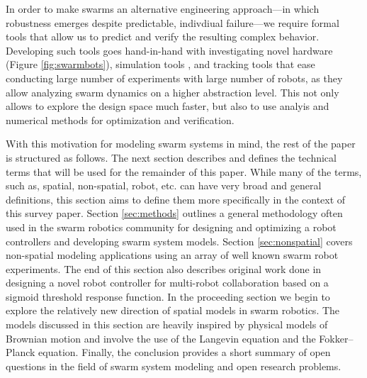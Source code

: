 \documentclass[Main.tex]{subfiles}
\begin{document}
In order to make swarms an alternative engineering approach---in which robustness emerges despite predictable, indivdiual failure---we require formal tools that allow us to predict and verify the resulting complex behavior. Developing such tools goes hand-in-hand with investigating novel hardware (Figure \ref{fig:swarmbots}), simulation tools \citep{Michel1998}, and tracking 
tools \cite{correlliros06,lochmatter08} that ease conducting large number of experiments with large number of robots, as they allow analyzing swarm dynamics on a higher abstraction level. This not only allows to explore the design space much faster, but also to use analyis and numerical methods for optimization and verification. 



With this motivation for modeling swarm systems in mind, the rest of the paper is structured as follows. The next section describes and defines the technical terms that will be used for the remainder of this paper. While many of the terms, such as, spatial, non-spatial, robot, etc. can have very broad and general definitions, this section aims to define them more specifically in the context of this survey paper. Section \ref{sec:methods} outlines a general methodology often used in the swarm robotics community for designing and optimizing a robot controllers and developing swarm system models. Section \ref{sec:nonspatial} covers non-spatial modeling applications using an array of well known swarm robot experiments. The end of this section also describes original work done in designing a novel robot controller for multi-robot collaboration based on a sigmoid threshold response function. In the proceeding section we begin to explore the relatively new direction of spatial models in swarm robotics. The models discussed in this section are heavily inspired by physical models of Brownian motion and involve the use of the Langevin equation and the Fokker--Planck equation. Finally, the conclusion provides a short summary of open questions in the field of swarm system modeling and open research problems.
\end{document}
